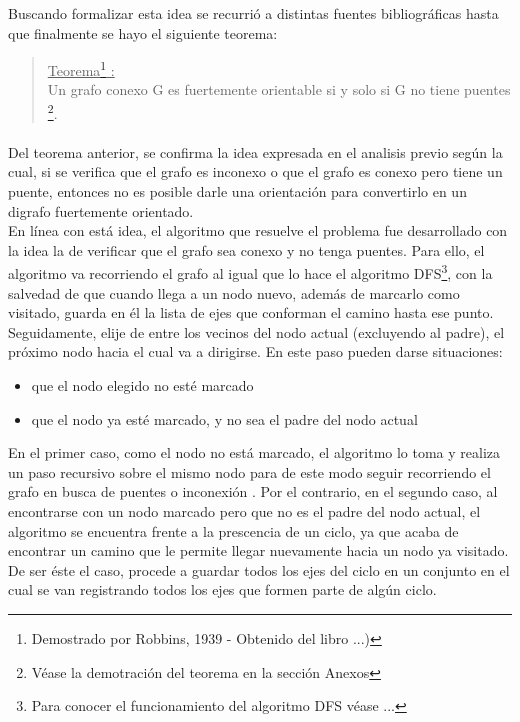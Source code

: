 Buscando formalizar esta idea se recurrió a distintas fuentes bibliográficas hasta que finalmente se hayo el siguiente teorema:

\begin{quote}
\label{robbins}
\underline{Teorema\footnote{Demostrado por Robbins, 1939 - Obtenido del libro ...)} :}\\ \vspace{7pt}
Un grafo conexo G es fuertemente orientable si y solo si G no tiene puentes \footnote{Véase la demotración del teorema en la sección Anexos}.
\end{quote}

\paragraph{} 
Del teorema anterior, se confirma la idea expresada en el analisis previo según la cual, si se verifica que el grafo es inconexo o que el grafo es conexo pero tiene un puente, entonces no es posible darle una orientación para convertirlo en un digrafo fuertemente orientado.\\
En línea con está idea, el algoritmo que resuelve el problema fue desarrollado con la idea la de verificar que el grafo sea conexo y no tenga puentes. Para ello, el algoritmo va recorriendo el grafo al igual que lo hace el algoritmo DFS\footnote{Para conocer el funcionamiento del algoritmo DFS véase ...}, con la salvedad de que cuando llega a un nodo nuevo, además de marcarlo como visitado, guarda en él la lista de ejes que conforman el camino hasta ese punto. Seguidamente, elije de entre los vecinos del nodo actual (excluyendo al padre), el próximo nodo hacia el cual va a dirigirse. En este paso pueden darse situaciones: 
\begin{itemize}
	\item que el nodo elegido no esté marcado
	\item que el nodo ya esté marcado, y no sea el padre del nodo actual
\end{itemize}
En el primer caso, como el nodo no está marcado, el algoritmo lo toma y realiza un paso recursivo sobre el mismo nodo para de este modo seguir recorriendo el grafo en busca de puentes o inconexión . Por el contrario, en el segundo caso, al encontrarse con un nodo marcado pero que no es el padre del nodo actual, el algoritmo se encuentra frente a la prescencia de un ciclo, ya que acaba de encontrar un camino que le permite llegar nuevamente hacia un nodo ya visitado. De ser éste el caso, procede a guardar todos los ejes del ciclo en un conjunto en el cual se van registrando todos los ejes que formen parte de algún ciclo.
